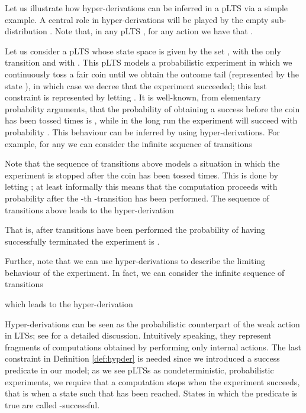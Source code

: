 \documentclass{LMCS}
\begin{document}
\begin{exa}
\label{ex:hyperderivative}
Let us illustrate how hyper-derivations can be inferred in a pLTS via a simple example. 
A central role in hyper-derivations will be played by the empty sub-distribution 
. Note that, in any pLTS , 
for any action  we have that .

Let us consider a pLTS whose state space is given by the set , with 
the only transition  
and with . 
This pLTS models a probabilistic experiment in which we continuously toss a fair coin 
until we obtain the outcome tail (represented by the state ), in which case we decree that the experiment succeeded; 
this last constraint is represented by letting .
It is well-known, from elementary probability arguments, 
that the probability of obtaining a success before the coin has been tossed  times
is , while in the long run the experiment will succeed with probability 
. 
This behaviour can be inferred by using hyper-derivations. For example, 
for any  we can consider the infinite sequence of transitions 


Note that the sequence of transitions above models a situation in which the 
experiment is stopped after the coin has been tossed  times. 
This is done by letting ; 
at least informally this means that the computation proceeds with 
probability  after the -th -transition has been performed.
The sequence of transitions above leads to the hyper-derivation 

That is, after  transitions have been performed the probability of having 
successfully terminated the experiment is .

Further, note that we can use hyper-derivations to describe the limiting behaviour of 
the experiment. In fact, we can consider the infinite sequence of 
transitions 

which leads to the hyper-derivation 

\end{exa}\medskip

\noindent Hyper-derivations can be seen as the probabilistic counterpart of the weak  action in 
LTSs; see \cite{DGHM09full} for a detailed discussion. 
Intuitively speaking, they represent fragments of computations obtained by performing only internal 
actions. The last constraint in Definition \ref{def:hypder} is needed since we introduced a success 
predicate in our model; as we see pLTSs as nondeterministic, probabilistic 
experiments, we require that a computation stops  
when the experiment succeeds, that is when a state  such that  
 has been reached.
States in which the predicate  
is true are called -successful.
\end{document}
